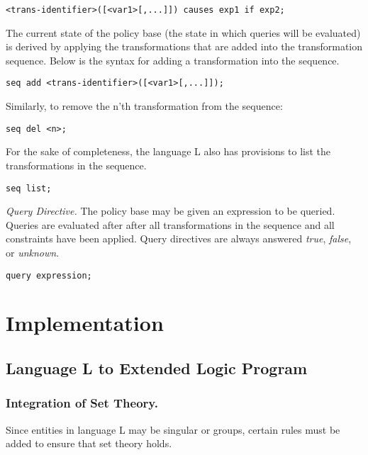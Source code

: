 \documentclass{llncs}
\begin{document}
    \begin{verbatim}<trans-identifier>([<var1>[,...]]) causes exp1 if exp2;\end{verbatim}

    The current state of the policy base (the state in which queries will be
    evaluated) is derived by applying the transformations that are added into
    the transformation sequence. Below is the syntax for adding a
    transformation into the sequence.

    \begin{verbatim}seq add <trans-identifier>([<var1>[,...]]);\end{verbatim}

    Similarly, to remove the n'th transformation from the sequence:

    \begin{verbatim}seq del <n>;\end{verbatim}

    For the sake of completeness, the language L also has provisions to list
    the transformations in the sequence.

    \begin{verbatim}seq list;\end{verbatim}

    \emph{Query Directive.} The policy base may be given an expression to be
    queried. Queries are evaluated after after all transformations in the
    sequence and all constraints have been applied. Query directives are
    always answered \emph{true}, \emph{false}, or \emph{unknown}.

    \begin{verbatim}query expression;\end{verbatim}

  \section{Implementation}

    \subsection{Language L to Extended Logic Program}

      \subsubsection{Integration of Set Theory.}

        Since entities in language L may be singular or groups, certain rules
        must be added to ensure that set theory holds.
\end{document}

